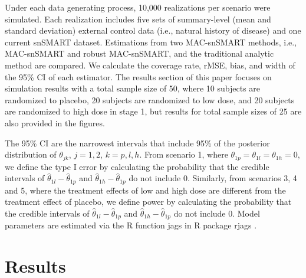 Under each data generating process, 10,000 realizations per scenario were simulated. Each realization includes five sets of summary-level (mean and standard deviation) external control data (i.e., natural history of disease) and one current \ac{snSMART} dataset. Estimations from two \ac{MAC}-snSMART methods, i.e., \ac{MAC}-snSMART and robust \ac{MAC}-snSMART, and the traditional analytic method are compared. We calculate the coverage rate, \ac{rMSE}, bias, and width of the 95\% \ac{CI} of each estimator. The results section of this paper focuses on simulation results with a total sample size of 50, where 10 subjects are randomized to placebo, 20 subjects are randomized to low dose, and 20 subjects are randomized to high dose in stage 1, but results for total sample sizes of 25 are also provided in the figures.

The 95\% \ac{CI} are the narrowest intervals that include 95\% of the posterior distribution of $\theta_{jk}$, $j=1,2$, $k=p,l,h$. From scenario 1, where $\theta_{1p} = \theta_{1l} = \theta_{1h} = 0$, we define the type I error by calculating the probability that the credible intervals of $\hat{\theta}_{1l} - \hat{\theta}_{1p}$ and $\hat{\theta}_{1h} - \hat{\theta}_{1p}$ do not include 0. Similarly, from scenarios 3, 4 and 5, where the treatment effects of low and high dose are different from the treatment effect of placebo, we define power by calculating the probability that the credible intervals of $\hat{\theta}_{1l} - \hat{\theta}_{1p}$ and $\hat{\theta}_{1h} - \hat{\theta}_{1p}$ do not include 0. Model parameters are estimated via the R function jags in R package rjags \citep{rjags}.

\section{Results} \label{s:results}

